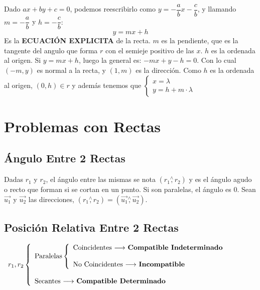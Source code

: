 \documentclass[11pt,a4paper]{article}
\begin{document}
\noindent Dado $ax+by+c=0$, podemos reescribirlo como $y=-\dfrac{a}{b}x-\dfrac{c}{b}$, y llamando $m=-\dfrac{a}{b}$ y $h=-\dfrac{c}{b}:$
\begin{equation}
y=mx+h
\end{equation}
Es la \textbf{ECUACI\'ON EXPLICITA} de la recta. $m$ es la pendiente, que es la tangente del angulo que forma $r$ con el semieje positivo de las $x$. $h$ es la ordenada al origen. Si $y=mx+h$, luego la general es: $-mx+y-h=0$. Con lo cual $(-m,y)$ es normal a la recta, y $(1,m)$ es la direcci\'on. Como $h$ es la ordenada al origen, $(0,h) \in r$ y adem\'as tenemos que $\left\{\begin{array}{l}
x=\lambda\\
y=h+m\cdot\lambda
\end{array}\right.$

\newpage
\section{Problemas con Rectas}
\subsection{\'Angulo Entre 2 Rectas}
\noindent Dadas $r_1$ y $r_2$, el \'angulo entre las mismas se nota $(r_1\overset{\wedge}{,}r_2)$ y es el \'angulo agudo o recto que forman si se cortan en un punto. Si son paralelas, el \'angulo es 0. Sean $\overrightarrow{u_1}$ y $\overrightarrow{u_2}$ las direcciones, $(r_1\overset{\wedge}{,}r_2) = (\overrightarrow{u_1}\overset{\wedge}{,}\overrightarrow{u_2})$.

\subsection{Posici\'on Relativa Entre 2 Rectas}
\begin{center}
$\begin{array}{l}
r_1,r_2 \left\{\begin{array}{l}
\text{Paralelas}
\left\{
\begin{array}{l}
\text{Coincidentes $\longrightarrow$ \textbf{Compatible Indeterminado}}\\ \\
\text{No Coincidentes $\longrightarrow$ \textbf{Incompatible}}
\end{array}
\right.
\\ \\
\text{Secantes $\longrightarrow$ \textbf{Compatible Determinado}}
\end{array}\right.
\\
\end{array}$
\end{center}
\end{document}
